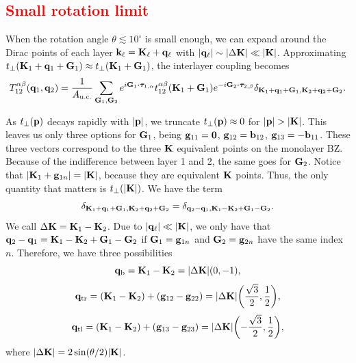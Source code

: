 \subsection{\textcolor{red}{Small rotation limit}}

When the rotation angle $\theta \lesssim 10^\circ$ is small enough, we can expand around the Dirac points of each layer ${\vb{k}}_\ell = {\vb{K}}_\ell + {\vb{q}}_\ell$ with $\abs{{\vb{q}}_\ell} \sim \abs{\Delta {\vb{K}}} \ll \abs{{\vb{K}}}$. Approximating $t_\perp({\vb{K}}_1+{\vb{q}}_1+{\vb{G}}_1) \approx t_\perp({\vb{K}}_1+{\vb{G}}_1)$, the interlayer coupling becomes
$$
T_{12}^{\alpha\beta}(\q_1,\q_2) = \frac{1}{A_{\text{u.c.}}} \sum_{\G_1,\G_2} e^{i\G_1\vdot\vtau_{1,\alpha}}
t_{12}^{\alpha\beta}(\K_1+\G_1) e^{-i\G_2\vdot\vtau_{2,\beta}}
\delta_{\K_1+\q_1+\G_1,\K_2+\q_2+\G_2}.
$$

As $t_\perp({\vb{p}})$ decays rapidly with $\abs{{\vb{p}}}$, we truncate $t_\perp({\vb{p}}) \approx 0$ for $\abs{{\vb{p}}} > \abs{{\vb{K}}}$. This leaves us only three options for ${\vb{G}}_1$, being ${\vb{g}}_{11} = {\vb{0}}$, ${\vb{g}}_{12} = {\vb{b}}_{12}$, ${\vb{g}}_{13} = -{\vb{b}}_{11}$. These three vectors correspond to the three ${\vb{K}}$ equivalent points on the monolayer BZ. Because of the indifference between layer 1 and 2, the same goes for ${\vb{G}}_2$. Notice that $\abs{{\vb{K}}_1+{\vb{g}}_{1n}} = \abs{{\vb{K}}}$, because they are equivalent ${\vb{K}}$ points. Thus, the only quantity that matters is $t_\perp(\abs{{\vb{K}}})$. We have the term
$$
\delta_{{\vb{K}}_1+{\vb{q}}_1+{\vb{G}}_1,{\vb{K}}_2+{\vb{q}}_2+{\vb{G}}_2} = \delta_{{\vb{q}}_2-{\vb{q}}_1,{\vb{K}}_1-{\vb{K}}_2+{\vb{G}}_1-{\vb{G}}_2}.
$$
We call $\Delta{\vb{K}} = {\vb{K}}_1-{\vb{K}}_2$. Due to $\abs{{\vb{q}}_\ell} \ll \abs{{\vb{K}}}$, we only have that ${\vb{q}}_2-{\vb{q}}_1 = {\vb{K}}_1-{\vb{K}}_2+{\vb{G}}_1-{\vb{G}}_2$ if ${\vb{G}}_1 = {\vb{g}}_{1n}$ and ${\vb{G}}_2 = {\vb{g}}_{2n}$ have the same index $n$. Therefore, we have three possibilities
$$
{\vb{q}}_\text{b} = {\vb{K}}_1 - {\vb{K}}_2 = \abs{\Delta {\vb{K}}} \qty(0, -1),
$$
$$
{\vb{q}}_\text{tr} = ({\vb{K}}_1 - {\vb{K}}_2) + ({\vb{g}}_{12} - {\vb{g}}_{22}) = \abs{\Delta {\vb{K}}} \qty(\frac{\sqrt{3}}{2}, \frac{1}{2}),
$$
$$
{\vb{q}}_\text{tl} = ({\vb{K}}_1 - {\vb{K}}_2) + ({\vb{g}}_{13} - {\vb{g}}_{23}) = \abs{\Delta {\vb{K}}} \qty(-\frac{\sqrt{3}}{2}, \frac{1}{2}),
$$
where $\abs{\Delta {\vb{K}}} = 2 \sin(\theta/2) \abs{{\vb{K}}}$.

